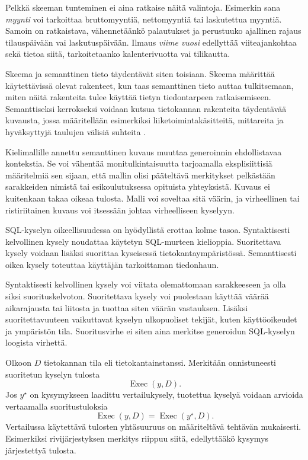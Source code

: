Pelkkä skeeman tunteminen ei aina ratkaise näitä
valintoja. Esimerkin sana \emph{myynti} voi tarkoittaa
bruttomyyntiä, nettomyyntiä tai laskutettua myyntiä.
Samoin on ratkaistava, vähennetäänkö palautukset ja
perustuuko ajallinen rajaus tilauspäivään vai
laskutuspäivään. Ilmaus \emph{viime vuosi} edellyttää
viiteajankohtaa sekä tietoa siitä, tarkoitetaanko
kalenterivuotta vai tilikautta.

Skeema ja semanttinen tieto täydentävät siten toisiaan.
Skeema määrittää käytettävissä olevat rakenteet,
kun taas semanttinen tieto auttaa tulkitsemaan,
miten näitä rakenteita tulee käyttää tietyn
tiedontarpeen ratkaisemiseen. Semanttiseksi kerrokseksi
voidaan kutsua tietokannan rakenteita täydentävää
kuvausta, jossa määritellään esimerkiksi
liiketoimintakäsitteitä, mittareita ja hyväksyttyjä
taulujen välisiä suhteita \cite{CortexAnalyst}.

Kielimallille annettu semanttinen kuvaus muuttaa
generoinnin ehdollistavaa kontekstia. Se voi vähentää
monitulkintaisuutta tarjoamalla eksplisiittisiä
määritelmiä sen sijaan, että mallin olisi pääteltävä
merkitykset pelkästään sarakkeiden nimistä tai
esikoulutuksessa opituista yhteyksistä. Kuvaus ei
kuitenkaan takaa oikeaa tulosta. Malli voi soveltaa
sitä väärin, ja virheellinen tai ristiriitainen
kuvaus voi itsessään johtaa virheelliseen kyselyyn.

SQL-kyselyn oikeellisuudessa on hyödyllistä erottaa kolme tasoa.
Syntaktisesti kelvollinen kysely noudattaa käytetyn SQL-murteen
kielioppia. Suoritettava kysely voidaan lisäksi suorittaa
kyseisessä tietokantaympäristössä. Semanttisesti oikea kysely
toteuttaa käyttäjän tarkoittaman tiedonhaun.

Syntaktisesti kelvollinen kysely voi viitata
olemattomaan sarakkeeseen ja olla siksi
suorituskelvoton. Suoritettava kysely voi puolestaan
käyttää väärää aikarajausta tai liitosta ja tuottaa
siten väärän vastauksen. Lisäksi suoritettavuuteen
vaikuttavat kyselyn ulkopuoliset tekijät, kuten
käyttöoikeudet ja ympäristön tila. Suoritusvirhe
ei siten aina merkitse generoidun SQL-kyselyn
loogista virhettä.

Olkoon \(D\) tietokannan tila eli tietokantainstanssi.
Merkitään onnistuneesti suoritetun kyselyn tulosta
$$
\operatorname{Exec}(y,D).
$$
Jos \(y^{\star}\) on kysymykseen laadittu vertailukysely,
tuotettua kyselyä voidaan arvioida vertaamalla
suoritustuloksia
$$
\operatorname{Exec}(y,D)
=
\operatorname{Exec}(y^{\star},D).
$$
Vertailussa käytettävä tulosten yhtäsuuruus on
määriteltävä tehtävän mukaisesti. Esimerkiksi
rivijärjestyksen merkitys riippuu siitä,
edellyttääkö kysymys järjestettyä tulosta.

